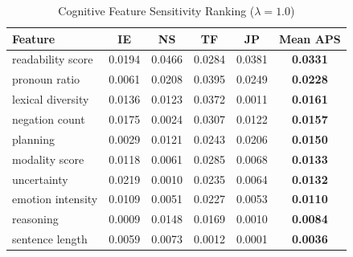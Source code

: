 \begin{table}[h]
\centering
\caption{Cognitive Feature Sensitivity Ranking ($\lambda=1.0$)}
\label{tab:sensitivity}
\begin{tabular}{lccccc}
\hline
Feature & IE & NS & TF & JP & \textbf{Mean APS} \\
\hline
readability score & 0.0194 & 0.0466 & 0.0284 & 0.0381 & \textbf{0.0331} \\
pronoun ratio & 0.0061 & 0.0208 & 0.0395 & 0.0249 & \textbf{0.0228} \\
lexical diversity & 0.0136 & 0.0123 & 0.0372 & 0.0011 & \textbf{0.0161} \\
negation count & 0.0175 & 0.0024 & 0.0307 & 0.0122 & \textbf{0.0157} \\
planning & 0.0029 & 0.0121 & 0.0243 & 0.0206 & \textbf{0.0150} \\
modality score & 0.0118 & 0.0061 & 0.0285 & 0.0068 & \textbf{0.0133} \\
uncertainty & 0.0219 & 0.0010 & 0.0235 & 0.0064 & \textbf{0.0132} \\
emotion intensity & 0.0109 & 0.0051 & 0.0227 & 0.0053 & \textbf{0.0110} \\
reasoning & 0.0009 & 0.0148 & 0.0169 & 0.0010 & \textbf{0.0084} \\
sentence length & 0.0059 & 0.0073 & 0.0012 & 0.0001 & \textbf{0.0036} \\
\hline
\end{tabular}
\end{table}
